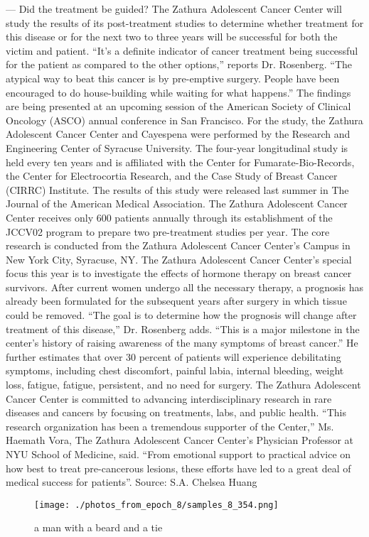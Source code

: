 \documentclass{article}%
\begin{document}
— Did the treatment be guided?\newline%
The Zathura Adolescent Cancer Center will study the results of its post{-}treatment studies to determine whether treatment for this disease or for the next two to three years will be successful for both the victim and patient. “It’s a definite indicator of cancer treatment being successful for the patient as compared to the other options,” reports Dr. Rosenberg. “The atypical way to beat this cancer is by pre{-}emptive surgery. People have been encouraged to do house{-}building while waiting for what happens.”\newline%
The findings are being presented at an upcoming session of the American Society of Clinical Oncology (ASCO) annual conference in San Francisco.\newline%
For the study, the Zathura Adolescent Cancer Center and Cayespena were performed by the Research and Engineering Center of Syracuse University. The four{-}year longitudinal study is held every ten years and is affiliated with the Center for Fumarate{-}Bio{-}Records, the Center for Electrocortia Research, and the Case Study of Breast Cancer (CIRRC) Institute. The results of this study were released last summer in The Journal of the American Medical Association.\newline%
The Zathura Adolescent Cancer Center receives only 600 patients annually through its establishment of the JCCV02 program to prepare two pre{-}treatment studies per year. The core research is conducted from the Zathura Adolescent Cancer Center’s Campus in New York City, Syracuse, NY.\newline%
The Zathura Adolescent Cancer Center’s special focus this year is to investigate the effects of hormone therapy on breast cancer survivors. After current women undergo all the necessary therapy, a prognosis has already been formulated for the subsequent years after surgery in which tissue could be removed. “The goal is to determine how the prognosis will change after treatment of this disease,” Dr. Rosenberg adds. “This is a major milestone in the center’s history of raising awareness of the many symptoms of breast cancer.” He further estimates that over 30 percent of patients will experience debilitating symptoms, including chest discomfort, painful labia, internal bleeding, weight loss, fatigue, fatigue, persistent, and no need for surgery.\newline%
The Zathura Adolescent Cancer Center is committed to advancing interdisciplinary research in rare diseases and cancers by focusing on treatments, labs, and public health. “This research organization has been a tremendous supporter of the Center,” Ms. Haemath Vora, The Zathura Adolescent Cancer Center’s Physician Professor at NYU School of Medicine, said. “From emotional support to practical advice on how best to treat pre{-}cancerous lesions, these efforts have led to a great deal of medical success for patients”.\newline%
Source: S.A. Chelsea Huang\newline%

%


\begin{figure}[h!]%
\centering%
\texttt{[image: ./photos\_from\_epoch\_8/samples\_8\_354.png]}%
\caption{a man with a beard and a tie}%
\end{figure}

%
\end{document}
